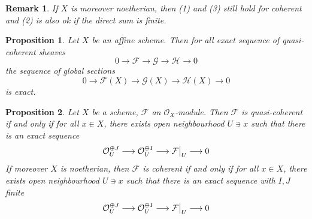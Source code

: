 \documentclass{ctexart}
\newtheorem{remark}{Remark}[section]
\newtheorem{proposition}{Proposition}[section]
\begin{document}
\begin{remark}
    If $X$ is moreover noetherian, then (1) and (3) still hold for coherent and (2) is also ok if the direct sum is finite.
\end{remark}
\begin{proposition}
    Let $X$ be an affine scheme.
    Then for all exact sequence of quasi-coherent sheaves 
    \begin{equation*}
        0 \longrightarrow \mathcal{F} \longrightarrow \mathcal{G} \longrightarrow \mathcal{H} \longrightarrow 0
    \end{equation*}
    the sequence of global sections 
    \begin{equation*}
        0 \longrightarrow \mathcal{F}(X) \longrightarrow \mathcal{G}(X) \longrightarrow \mathcal{H}(X) \longrightarrow 0
    \end{equation*}
    is exact.
    \label{Proposition 6.4}
\end{proposition}
\begin{proposition}
    Let $X$ be a scheme, $\mathcal{F}$ an $\mathcal{O}_{X}$-module.
    Then $\mathcal{F}$ is quasi-coherent if and only if for all $x\in X$, 
    there exists open neighbourhood $U\ni x$ such that there is an exact sequence
    \begin{equation*}
        \mathcal{O}_{U}^{\oplus J} \longrightarrow \mathcal{O}_{U}^{\oplus I} \longrightarrow \mathcal{F}\big{|}_{U} \longrightarrow 0
    \end{equation*}
    If moreover $X$ is noetherian,
    then $\mathcal{F}$ is coherent if and only if for all $x\in X$, 
    there exists open neighbourhood $U\ni x$ such that there is an exact sequence with $I,J$ finite
    \begin{equation*}
        \mathcal{O}_{U}^{\oplus J} \longrightarrow \mathcal{O}_{U}^{\oplus I} \longrightarrow \mathcal{F}\big{|}_{U} \longrightarrow 0
    \end{equation*}
    \label{Proposition 6.5}
\end{proposition}
\end{document}
